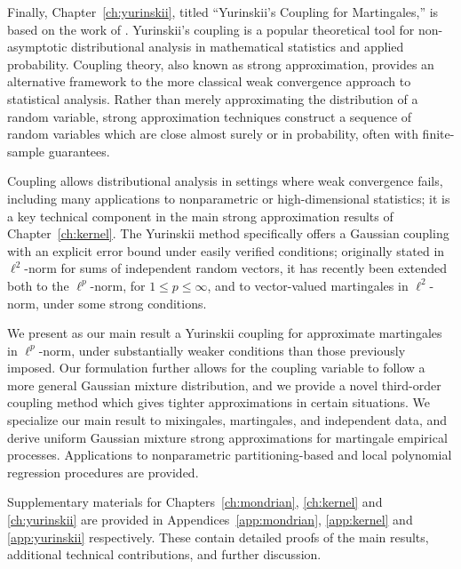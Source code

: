 Finally, Chapter~\ref{ch:yurinskii}, titled ``Yurinskii's Coupling for
Martingales,'' is based on the work of \cite{cattaneo2022yurinskii}.
Yurinskii's coupling is a popular theoretical tool for non-asymptotic
distributional analysis in mathematical statistics and applied probability.
Coupling theory, also known as strong approximation, provides an
alternative framework to the more classical weak convergence approach
to statistical analysis. Rather
than merely approximating the distribution of a random variable, strong
approximation techniques construct a sequence of random variables
which are close almost surely or in probability, often with
finite-sample guarantees.

Coupling allows distributional analysis in settings where weak convergence
fails, including many applications to nonparametric or high-dimensional
statistics; it is a key technical component in the main strong approximation
results of Chapter~\ref{ch:kernel}. The Yurinskii method specifically offers a
Gaussian coupling with an explicit error bound under easily verified
conditions; originally stated in $\ell^2$-norm for sums of independent random
vectors, it has recently been extended both to the $\ell^p$-norm, for $1 \leq p
\leq \infty$, and to vector-valued martingales in $\ell^2$-norm, under some
strong conditions.

We present as our main result a Yurinskii coupling for approximate martingales
in $\ell^p$-norm, under substantially weaker conditions than those previously
imposed. Our formulation further allows for the coupling variable to follow a
more general Gaussian mixture distribution, and we provide a novel third-order
coupling method which gives tighter approximations in certain situations. We
specialize our main result to mixingales, martingales, and independent data,
and derive uniform Gaussian mixture strong approximations for martingale
empirical processes. Applications to nonparametric partitioning-based and local
polynomial regression procedures are provided.

Supplementary materials for
Chapters~\ref{ch:mondrian}, \ref{ch:kernel} and \ref{ch:yurinskii}
are provided in Appendices~\ref{app:mondrian}, \ref{app:kernel}
and \ref{app:yurinskii} respectively.
These contain detailed proofs of the main results, additional technical
contributions, and further discussion.
